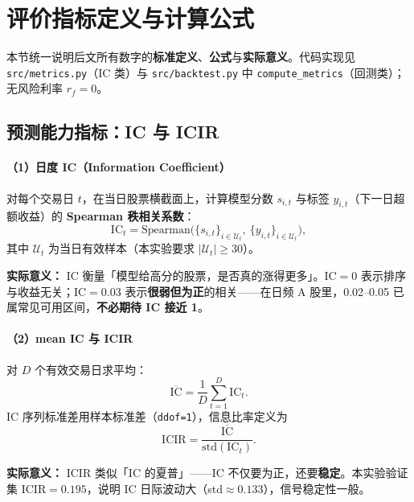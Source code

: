 \documentclass[UTF8,a4paper,12pt]{ctexart}
\begin{document}
\section{评价指标定义与计算公式}

本节统一说明后文所有数字的\textbf{标准定义}、\textbf{公式}与\textbf{实际意义}。代码实现见 \texttt{src/metrics.py}（IC 类）与 \texttt{src/backtest.py} 中 \texttt{compute\_metrics}（回测类）；无风险利率 $r_f=0$。

\subsection{预测能力指标：IC 与 ICIR}

\paragraph{（1）日度 IC（Information Coefficient）}

对每个交易日 $t$，在当日股票横截面上，计算模型分数 $s_{i,t}$ 与标签 $y_{i,t}$（下一日超额收益）的 \textbf{Spearman 秩相关系数}：
\begin{equation}
  \mathrm{IC}_t = \mathrm{Spearman}\big(\{s_{i,t}\}_{i\in\mathcal U_t},\ \{y_{i,t}\}_{i\in\mathcal U_t}\big),
\end{equation}
其中 $\mathcal U_t$ 为当日有效样本（本实验要求 $\lvert\mathcal U_t\rvert\ge 30$）。

\textbf{实际意义：} IC 衡量「模型给高分的股票，是否真的涨得更多」。IC$=0$ 表示排序与收益无关；IC$=0.03$ 表示\textbf{很弱但为正}的相关——在日频 A 股里，0.02--0.05 已属常见可用区间，\textbf{不必期待 IC 接近 1}。

\paragraph{（2）mean IC 与 ICIR}

对 $D$ 个有效交易日求平均：
\begin{equation}
  \overline{\mathrm{IC}} = \frac{1}{D}\sum_{t=1}^{D}\mathrm{IC}_t.
\end{equation}
IC 序列标准差用样本标准差（\texttt{ddof=1}），信息比率定义为
\begin{equation}
  \mathrm{ICIR} = \frac{\overline{\mathrm{IC}}}{\mathrm{std}(\mathrm{IC}_t)}.
\end{equation}

\textbf{实际意义：} ICIR 类似「IC 的夏普」——IC 不仅要为正，还要\textbf{稳定}。本实验验证集 ICIR$=0.195$，说明 IC 日际波动大（std$\approx 0.133$），信号稳定性一般。
\end{document}
